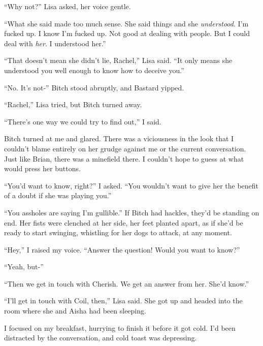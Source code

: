 ``Why not?''  Lisa asked, her voice gentle.



``What she said made too much sense.  She said things and she \emph{understood}.  I'm fucked up.  I know I'm fucked up.  Not good at dealing with people.  But I could deal with \emph{her}.  I understood her.''



``That doesn't mean she didn't lie, Rachel,'' Lisa said.  ``It only means she understood you well enough to know how to deceive you.''



``No.  It's not-''  Bitch stood abruptly, and Bastard yipped.



``Rachel,'' Lisa tried, but Bitch turned away.



``There's one way we could try to find out,'' I said.



Bitch turned at me and glared.  There was a viciousness in the look that I couldn't blame entirely on her grudge against me or the current conversation.  Just like Brian, there was a minefield there.  I couldn't hope to guess at what would press her buttons.



``You'd want to know, right?'' I asked.  ``You wouldn't want to give her the benefit of a doubt if she was playing you.''



``You assholes are saying I'm gullible.''  If Bitch had hackles, they'd be standing on end.  Her fists were clenched at her side, her feet planted apart, as if she'd be ready to start swinging, whistling for her dogs to attack, at any moment.



``Hey,'' I raised my voice.  ``Answer the question!  Would you want to know?''



``Yeah, but-''



``Then we get in touch with Cherish.  We get an answer from her.  She'd know.''



``I'll get in touch with Coil, then,'' Lisa said.  She got up and headed into the room where she and Aisha had been sleeping.



I focused on my breakfast, hurrying to finish it before it got cold.  I'd been distracted by the conversation, and cold toast was depressing.



